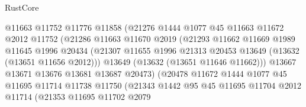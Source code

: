\begin{lexlean}{RustCore}
\begin{coremodule}
                                @11663
                                @11752
                                @11776
                                @11858
                                (@21276
                                  @1444
                                  @1077
                                  @45
                                  @11663
                                  @11672
                                  @2012
                                  @11752
                                  (@21286
                                    @11663
                                    @11670
                                    @2019
                                    (@21293
                                      @11662
                                      @11669
                                      @1989
                                      @11645
                                      @1996
                                      @20434
                                      (@21307
                                        @11655
                                        @1996
                                        @21313
                                        @20453
                                        @13649
                                        (@13632 (@13651 @11656 @2012)))
                                      @13649
                                      (@13632 (@13651 @11646 @11662)))
                                    @13667
                                    @13671
                                    @13676
                                    @13681
                                    @13687
                                    @20473)
                                  (@20478
                                    @11672
                                    @1444
                                    @1077
                                    @45
                                    @11695
                                    @11714
                                    @11738
                                    @11750
                                    (@21343
                                      @1442
                                      @95
                                      @45
                                      @11695
                                      @11704
                                      @2012
                                      @11714
                                      (@21353
                                        @11695
                                        @11702
                                        @2079

\end{coremodule}
\end{lexlean}
